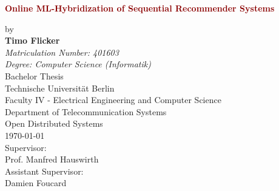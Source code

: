 \begin{titlepage}
\begin{figure}[H]
  \centering
  \vspace*{-1.22cm}
  \hfill
\end{figure}
	\begin{center}
	\vspace{1cm}
		\Huge
		\begin{spacing}{.9}
			\textcolor{DarkRed}{\textbf{Online ML-Hybridization of Sequential Recommender Systems}}\\
		\end{spacing}
		\vspace{0.8cm}
		\large
		by\\
		\vspace{0.8cm} 
		\textbf{Timo Flicker}\\
		\vspace{0.8cm} 
		\emph{Matriculation Number: 401603}\\
		\emph{{Degree:} Computer Science (Informatik)}\\
		\vspace{1cm} 
	 	Bachelor Thesis\\
		\vspace{0.5cm}
		Technische Universität Berlin\\
		Faculty IV - Electrical Engineering and Computer Science\\
		Department of Telecommunication Systems\\
		Open Distributed Systems\\
		\vspace{1.0cm}
		\today\\
		\vspace{1.0cm}
		\large
		Supervisor:\\
		Prof. Manfred Hauswirth\\
		\vspace{1cm}
		Assistant Supervisor:\\
		Damien Foucard
		\end{center}
\end{titlepage}

\newpage

